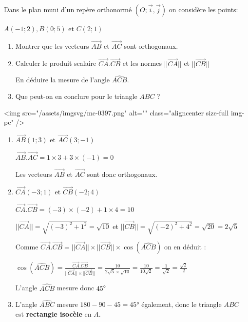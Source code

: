 
%
Dans le plan muni d'un repère orthonormé $\left(O ; \vec{i}, \vec{j}\right)$ on considère les points:
\par
$A \left(-1 ; 2\right) , B \left(0 ; 5\right)$ et $C \left(2 ; 1\right)$
\begin{enumerate}
     \item
     Montrer que les vecteurs $\overrightarrow{AB}$ et $\overrightarrow{AC}$ sont orthogonaux.
     \item
     Calculer le produit scalaire $\overrightarrow{CA}.\overrightarrow{CB}$ et les normes $||\overrightarrow{CA}||$ et $||\overrightarrow{CB}||$
     \par
     En déduire la mesure de l'angle $\widehat{ACB}$.
     \item
     Que peut-on en conclure pour le triangle $ABC$ ?
\end{enumerate}
\begin{corrige}
     <img src="/assets/imgsvg/mc-0397.png" alt="" class="aligncenter size-full  img-pc" />
     \begin{enumerate}
          \item
          $\overrightarrow{AB} \left(1 ; 3\right)$ et $\overrightarrow{AC} \left(3 ; -1\right)$
          \par
          $\overrightarrow{AB}.\overrightarrow{AC}=1\times 3+3\times \left(-1\right)=0$
          \par
          Les vecteurs $\overrightarrow{AB}$ et $\overrightarrow{AC}$ sont donc orthogonaux.
          \item
          $\overrightarrow{CA} \left(-3 ; 1\right)$ et $\overrightarrow{CB} \left(-2 ; 4\right)$
          \par
          $\overrightarrow{CA}.\overrightarrow{CB}=\left(-3\right)\times \left(-2\right)+1\times 4=10$
          \par
          $||\overrightarrow{CA}||=\sqrt{\left(-3\right)^{2}+1^{2}}=\sqrt{10}$ et $||\overrightarrow{CB}||=\sqrt{\left(-2\right)^{2}+4^{2}}=\sqrt{20}=2\sqrt{5}$
          \par
          Comme $\overrightarrow{CA}.\overrightarrow{CB}=||\overrightarrow{CA}||\times ||\overrightarrow{CB}||\times \cos\left(\widehat{ACB}\right)$ on en déduit :
          \par
          $\cos\left(\widehat{ACB}\right) = \frac{\overrightarrow{CA}.\overrightarrow{CB}}{||\overrightarrow{CA}||\times ||\overrightarrow{CB}||} = \frac{10}{2\sqrt{5}\times \sqrt{10}}=\frac{10}{10\sqrt{2}}=\frac{1}{\sqrt{2}}=\frac{\sqrt{2}}{2}$
          \par
          L'angle $\widehat{ACB}$ mesure donc $45$°
          \item
          L'angle $\widehat{ABC}$ mesure $180-90-45=45$° également, donc le triangle $ABC$ est \textbf{rectangle isocèle} en $A$.
     \end{enumerate}
\end{corrige}
